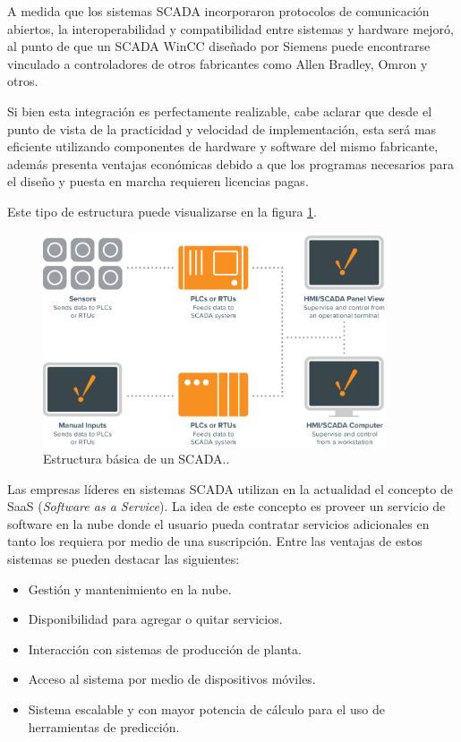 A medida que los sistemas SCADA incorporaron protocolos de comunicación abiertos, la interoperabilidad y compatibilidad entre sistemas y hardware mejoró, al punto de que un SCADA WinCC diseñado por Siemens puede encontrarse vinculado a controladores de otros fabricantes como Allen Bradley, Omron y otros.

Si bien esta integración es perfectamente realizable, cabe aclarar que desde el punto de vista de la practicidad y velocidad de implementación, esta será mas eficiente utilizando componentes de hardware y software del mismo fabricante, además presenta ventajas económicas debido a que los programas necesarios para el diseño y puesta en marcha requieren licencias pagas.

Este tipo de estructura puede visualizarse en la figura \ref{fig:SCNOW}.

\begin{figure}[htbp]
	\centering
	\includegraphics[width=0.9\textwidth]{./Figures/BasicSCADA.png}
	\caption{Estructura básica de un SCADA.\protect\footnotemark.}
	\label{fig:SCNOW}
\end{figure}
 
Las empresas líderes en sistemas SCADA utilizan en la actualidad el concepto de SaaS (\textit{Software as a Service}). La idea de este concepto es proveer un servicio de software en la nube donde el usuario pueda contratar servicios adicionales en tanto los requiera por medio de una suscripción. Entre las ventajas de estos sistemas se pueden destacar las siguientes:

\begin{itemize}
	\item Gestión y mantenimiento en la nube.
	\item Disponibilidad para agregar o quitar servicios.
	\item Interacción con sistemas de producción de planta.
	\item Acceso al sistema por medio de dispositivos móviles. 
	\item Sistema escalable y con mayor potencia de cálculo para el uso de herramientas de predicción.
\end{itemize}


